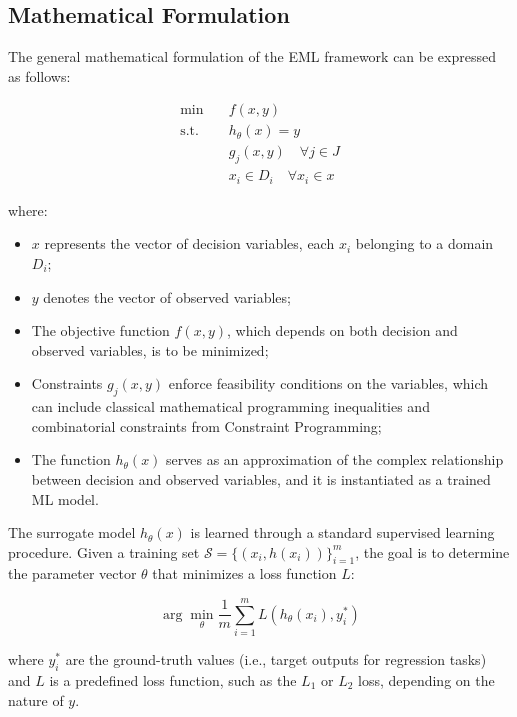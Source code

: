 \documentclass[a4paper,singleside,12pt]{report} %
\begin{document}
\subsection{Mathematical Formulation}

The general mathematical formulation of the EML framework can be expressed as follows:

\begin{align}
    \min \quad & f(x, y) \label{eq:objective} \\
    \text{s.t.} \quad & h_{\theta}(x) = y \label{eq:surrogate} \\
    & g_j(x, y) \quad \forall j \in J \label{eq:constraints} \\
    & x_i \in D_i \quad \forall x_i \in x \label{eq:domain}
\end{align}

where:
\begin{itemize}
    \item $x$ represents the vector of decision variables, each $x_i$ belonging to a domain $D_i$;
    \item $y$ denotes the vector of observed variables;
    \item The objective function $f(x, y)$, which depends on both decision and observed variables, is to be minimized;
    \item Constraints $g_j(x, y)$ enforce feasibility conditions on the variables, which can include classical mathematical programming 
    inequalities and combinatorial constraints from Constraint Programming;
    \item The function $h_{\theta}(x)$ serves as an approximation of the complex relationship between decision and observed variables, and 
    it is instantiated as a trained ML model.
\end{itemize}

The surrogate model $h_{\theta}(x)$ is learned through a standard supervised learning procedure. Given a training set $\mathcal{S} 
= \{(x_i, h(x_i))\}_{i=1}^{m}$, the goal is to determine the parameter vector $\theta$ that minimizes a loss function $L$:

\begin{equation}
    \arg\min_{\theta} \frac{1}{m} \sum_{i=1}^{m} L(h_{\theta}(x_i), y_i^*)
\end{equation}

where $y_i^*$ are the ground-truth values (i.e., target outputs for regression tasks) and $L$ is a predefined loss function, 
such as the $L_1$ or $L_2$ loss, depending on the nature of $y$.
\end{document}
